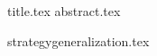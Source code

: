 \documentclass[11pt]{llncs}
\begin{document}
  {title.tex}
  \thispagestyle{plain}
  {abstract.tex}

  {strategygeneralization.tex}
  
\end{document}
